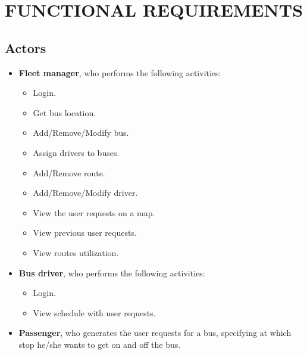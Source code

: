\section{FUNCTIONAL REQUIREMENTS}
\subsection{Actors}
\begin{itemize}
	\item \textbf{Fleet manager}, who performs the following activities:
	\begin{itemize}
		\item Login.
		\item Get bus location.
		\item Add/Remove/Modify bus.
		\item Assign drivers to buses.
		\item Add/Remove route.
		\item Add/Remove/Modify driver.
		\item View the user requests on a map.
		\item View previous user requests.
		\item View routes utilization.
	\end{itemize}
\item \textbf{Bus driver}, who performs the following activities:
\begin{itemize}
	\item Login.
	\item View schedule with user requests.
\end{itemize}
\item \textbf{Passenger}, who generates the user requests for a bus, specifying at which stop he/she wants to get on and off the bus.
\end{itemize}
\newpage
